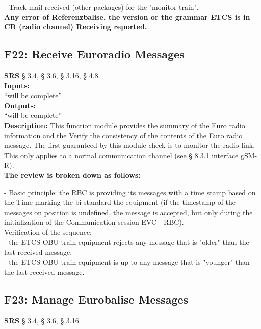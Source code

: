 \documentclass{template/openetcs_report}
\begin{document}
- Track-mail received (other packages) for the "monitor train". \\

\textbf{Any error of Referenzbalise, the version or the grammar ETCS is in CR (radio channel) 
Receiving reported.}\\
 
 
 \subsection{F22: Receive Euroradio Messages}
  \textbf{SRS} § 3.4, § 3.6, § 3.16, § 4.8\\
  
    \textbf{Inputs:}\\
``will be complete''\\

 \textbf{Outputs:}\\
 ``will be complete''\\
 
\textbf{Description:} 
This function module provides the summary of the Euro radio information and the 
Verify the consistency of the contents of the Euro radio message. 
The first guaranteed by this module check is to monitor the radio link. 
This only applies to a normal communication channel (see § 8.3.1 interface gSM-R). \\

\textbf{The review is broken down as follows:}

- Basic principle: the RBC is providing its messages with a time stamp based on the 
Time marking the bi-standard the equipment (if the timestamp of the messages on 
position is undefined, the message is accepted, but only during the initialization of the 
Communication session EVC - RBC).\\

Verification of the sequence: \\

- the ETCS OBU train equipment rejects any message that is "older" than the last 
received message.\\

- the ETCS OBU train equipment is up to any message that is "younger" than the last 
received message.\\
 	 
 	 
\subsection{F23: Manage Eurobalise Messages}
\textbf{SRS} § 3.4, § 3.6, § 3.16\\
  
\end{document}
